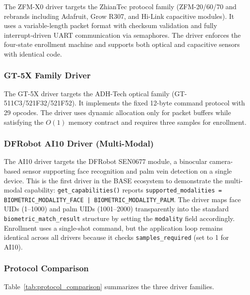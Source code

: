 The ZFM-X0 driver targets the ZhianTec protocol family (ZFM-20/60/70 and rebrands including Adafruit, Grow R307, and Hi-Link capacitive modules). It uses a variable-length packet format with checksum validation and fully interrupt-driven UART communication via semaphores. The driver enforces the four-state enrollment machine and supports both optical and capacitive sensors with identical code.

\subsubsection{GT-5X Family Driver}

The GT-5X driver targets the ADH-Tech optical family (GT-511C3/521F32/521F52). It implements the fixed 12-byte command protocol with 29 opcodes. The driver uses dynamic allocation only for packet buffers while satisfying the $O(1)$ memory contract and requires three samples for enrollment.

\subsubsection{DFRobot AI10 Driver (Multi-Modal)}

The AI10 driver targets the DFRobot SEN0677 module, a binocular camera-based sensor supporting face recognition and palm vein detection on a single device. This is the first driver in the BASE ecosystem to demonstrate the multi-modal capability: \texttt{get\_capabilities()} reports \texttt{supported\_modalities = BIOMETRIC\_MODALITY\_FACE | BIOMETRIC\_MODALITY\_PALM}. The driver maps face UIDs (1--1000) and palm UIDs (1001--2000) transparently into the standard \texttt{biometric\_match\_result} structure by setting the \texttt{modality} field accordingly. Enrollment uses a single-shot command, but the application loop remains identical across all drivers because it checks \texttt{samples\_required} (set to 1 for AI10).

\subsubsection{Protocol Comparison}

Table~\ref{tab:protocol_comparison} summarizes the three driver families.

